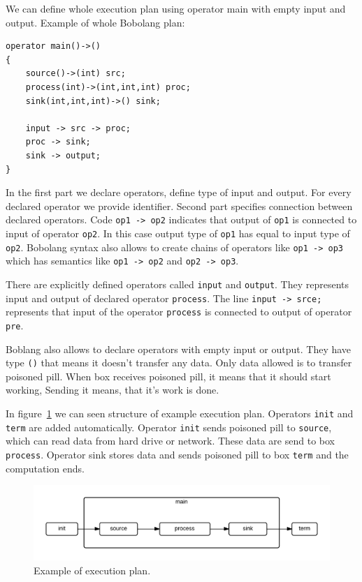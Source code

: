 We can define whole execution plan using operator main with empty input and output. Example of whole Bobolang plan:

\begin{verbatim}
operator main()->()
{
    source()->(int) src;
    process(int)->(int,int,int) proc;
    sink(int,int,int)->() sink;

    input -> src -> proc; 
    proc -> sink;
    sink -> output;
}
\end{verbatim}

In the first part we declare operators, define type of input and output. For every declared operator we provide identifier. Second part specifies connection between declared operators. Code \verb|op1 -> op2| indicates that output of \verb|op1| is connected to input of operator \verb|op2|. In this case output type of \verb|op1| has equal to input type of \verb|op2|. Bobolang syntax also allows to create chains of operators like \verb|op1 -> op3| which has semantics like \verb|op1 -> op2| and \verb|op2 -> op3|. 

There are explicitly defined operators called \verb|input| and \verb|output|. They represents input and output of declared operator \verb|process|. The line \verb|input -> srce;| represents that input of the operator \verb|process| is connected to output of operator \verb|pre|.

Boblang also allows to declare operators with empty input or output. They have type \verb|()| that means it doesn't transfer any data. Only data allowed is to transfer poisoned pill. When box receives poisoned pill, it means that it should start working, Sending it means, that it's work is done.


 In figure~\ref{fig:exampleplan} we can seen structure of example execution plan. Operators \verb|init| and \verb|term| are added automatically. Operator \verb|init| sends poisoned pill to \verb|source|, which can read data from hard drive or network. These data are send to box \verb|process|. Operator sink stores data and sends poisoned pill to box \verb|term| and the computation ends.
\begin{figure}[h!]
  \centering

    \includegraphics[width=1\textwidth]{exampleplan}
    
      \caption{Example of execution plan.}
        \label{fig:exampleplan}
\end{figure}




